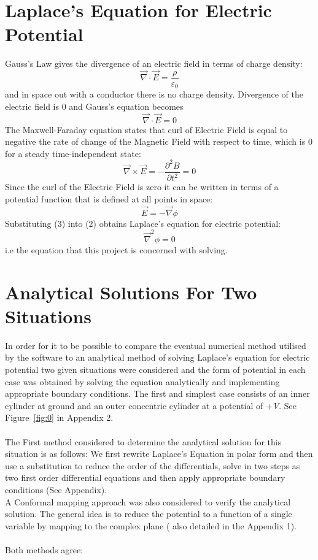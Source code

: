 \documentclass{article}
\begin{document}
\section{Laplace's Equation for Electric Potential}
Gauss's Law gives the divergence of an electric field in terms of charge density: 
\begin{equation}
\vec{\nabla} \cdot \vec{E} = \frac{\rho}{\varepsilon_{0}}
\label{1}
\end{equation}
and in space out with a conductor there is no charge density.  Divergence of the electric field is 0 and Gauss's equation becomes
\begin{equation}
\vec{\nabla} \cdot \vec{E} =0
\label{2}
\end{equation}
The Maxwell-Faraday equation states that curl of Electric Field is equal to negative the rate of change of the Magnetic Field with respect to time, which is 0 for a steady time-independent state:
\begin{equation}
\vec{\nabla}\times\vec{E} = -\frac{\partial^2{B}}{\partial{t}^2} = 0
\label{3}
\end{equation}
Since the curl of the Electric Field is zero it can be written in terms of a potential function \phi\) that is defined at all points in space:
\begin{equation}
\vec{E} = -\vec{\nabla}\phi
\label{eq:efield}
\end{equation}
Substituting (3) into (2) obtains Laplace's equation for electric potential:
\begin{equation}
\vec{\nabla}^2\phi = 0
\label{eq:laplace}
\end{equation}
i.e the equation that this project is concerned with solving.
\section{Analytical Solutions For Two Situations} 
In order for it to be possible to compare the eventual numerical method utilised by the software to an analytical method of solving Laplace's equation for electric potential two given situations were considered and the form of potential in each case was obtained by solving the equation analytically and implementing appropriate boundary conditions. 
\newline The first and simplest case consists of an inner cylinder at ground and an outer concentric cylinder at a potential of +\textit{V}. See Figure~\ref{fig:0} in Appendix 2. \\
\\
The First method considered to determine the analytical solution for this situation is as follows: We first rewrite Laplace's Equation in polar form and then use a substitution to reduce the order of the differentials, solve in two steps as two first order differential equations and then apply appropriate boundary conditions (See Appendix). \\
A Conformal mapping approach was also considered to verify the analytical solution. The general idea is to reduce the potential to a function of a single variable by mapping to the complex plane ( also detailed in the Appendix 1).  \\
\\
Both methods agree: 
\end{document}
